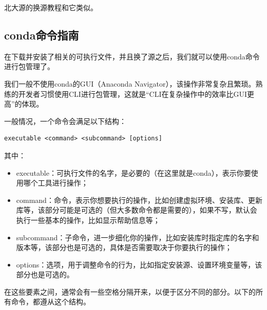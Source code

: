\documentclass[12pt]{ctexart}
\begin{document}
北大源的换源教程和它类似。

\subsection{conda命令指南}

在下载并安装了相关的可执行文件，并且换了源之后，我们就可以使用conda命令进行包管理了。

我们一般不使用conda的GUI（Anaconda Navigator），该操作非常复杂且繁琐。熟练的开发者习惯使用CLI进行包管理，这就是“CLI在复杂操作中的效率比GUI更高”的体现。

一般情况，一个命令会满足以下结构：
\begin{verbatim}
executable <command> <subcommand> [options]
\end{verbatim}
其中：
\begin{itemize}
    \item executable：可执行文件的名字，是必要的（在这里就是conda），表示你要使用哪个工具进行操作；
    \item command：命令，表示你想要执行的操作，比如创建虚拟环境、安装库、更新库等，该部分可能是可选的（但大多数命令都是需要的），如果不写，默认会执行一些基本的操作，比如显示帮助信息等；
    \item subcommand：子命令，进一步细化你的操作，比如安装库时指定库的名字和版本等，该部分也是可选的，具体是否需要取决于你要执行的操作；
    \item options：选项，用于调整命令的行为，比如指定安装源、设置环境变量等，该部分也是可选的。
\end{itemize}
在这些要素之间，通常会有一些空格分隔开来，以便于区分不同的部分。以下的所有命令，都遵从这个结构。
    
\end{document}
